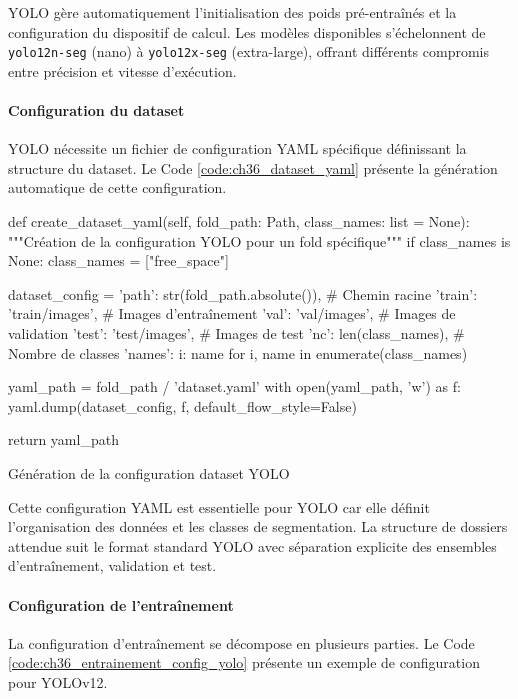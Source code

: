 YOLO gère automatiquement l'initialisation des poids pré-entraînés et la configuration du dispositif de calcul. Les modèles disponibles s'échelonnent de \texttt{yolo12n-seg} (nano) à \texttt{yolo12x-seg} (extra-large), offrant différents compromis entre précision et vitesse d'exécution.

\paragraph{Configuration du dataset}
YOLO nécessite un fichier de configuration YAML spécifique définissant la structure du dataset. Le Code \ref{code:ch36_dataset_yaml} présente la génération automatique de cette configuration.

\begin{code}[H]
    \begin{pythoncode}
        def create_dataset_yaml(self, fold_path: Path, class_names: list = None):
            """Création de la configuration YOLO pour un fold spécifique"""
            if class_names is None:
                class_names = ["free_space"]
            
            dataset_config = {
                'path': str(fold_path.absolute()),    # Chemin racine
                'train': 'train/images',              # Images d'entraînement
                'val': 'val/images',                  # Images de validation
                'test': 'test/images',                # Images de test
                'nc': len(class_names),               # Nombre de classes
                'names': {i: name for i, name in enumerate(class_names)}
            }
            
            yaml_path = fold_path / 'dataset.yaml'
            with open(yaml_path, 'w') as f:
                yaml.dump(dataset_config, f, default_flow_style=False)
            
            return yaml_path
    \end{pythoncode}
    \caption{Génération de la configuration dataset YOLO}
    \label{code:ch36_dataset_yaml}
\end{code}

Cette configuration YAML est essentielle pour YOLO car elle définit l'organisation des données et les classes de segmentation. La structure de dossiers attendue suit le format standard YOLO avec séparation explicite des ensembles d'entraînement, validation et test.

\paragraph{Configuration de l'entraînement}
La configuration d'entraînement se décompose en plusieurs parties. Le Code \ref{code:ch36_entrainement_config_yolo} présente un exemple de configuration pour YOLOv12.

